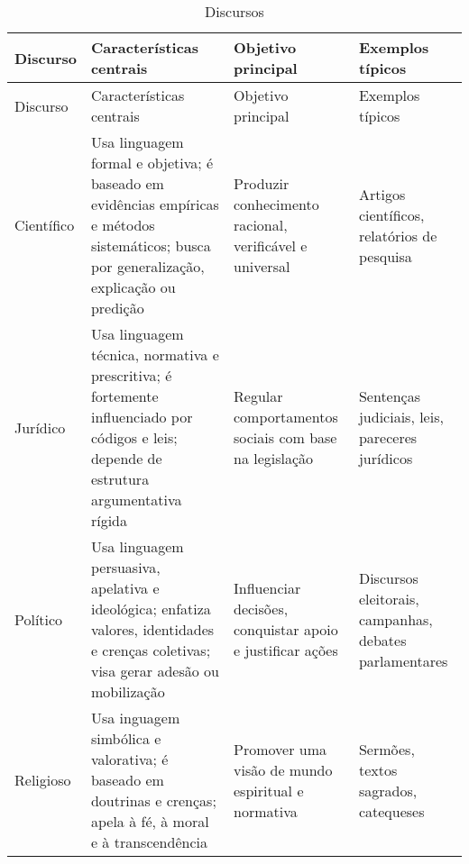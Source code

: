 \documentclass[
  letterpaper,
  DIV=11,
  numbers=noendperiod]{scrreprt}
\begin{document}
\begin{longtable}[]{@{}
  >{\raggedright\arraybackslash}p{}
  >{\raggedright\arraybackslash}p{}
  >{\raggedright\arraybackslash}p{}
  >{\raggedright\arraybackslash}p{}@{}}
\caption{Discursos}\tabularnewline
\toprule\noalign{}
\begin{minipage}[b]{\linewidth}\raggedright
Discurso
\end{minipage} & \begin{minipage}[b]{\linewidth}\raggedright
Características centrais
\end{minipage} & \begin{minipage}[b]{\linewidth}\raggedright
Objetivo principal
\end{minipage} & \begin{minipage}[b]{\linewidth}\raggedright
Exemplos típicos
\end{minipage} \\
\midrule\noalign{}
\endfirsthead
\toprule\noalign{}
\begin{minipage}[b]{\linewidth}\raggedright
Discurso
\end{minipage} & \begin{minipage}[b]{\linewidth}\raggedright
Características centrais
\end{minipage} & \begin{minipage}[b]{\linewidth}\raggedright
Objetivo principal
\end{minipage} & \begin{minipage}[b]{\linewidth}\raggedright
Exemplos típicos
\end{minipage} \\
\midrule\noalign{}
\endhead
\bottomrule\noalign{}
\endlastfoot
Científico & Usa linguagem formal e objetiva; é baseado em evidências
empíricas e métodos sistemáticos; busca por generalização, explicação ou
predição & Produzir conhecimento racional, verificável e universal &
Artigos científicos, relatórios de pesquisa \\
Jurídico & Usa linguagem técnica, normativa e prescritiva; é fortemente
influenciado por códigos e leis; depende de estrutura argumentativa
rígida & Regular comportamentos sociais com base na legislação &
Sentenças judiciais, leis, pareceres jurídicos \\
Político & Usa linguagem persuasiva, apelativa e ideológica; enfatiza
valores, identidades e crenças coletivas; visa gerar adesão ou
mobilização & Influenciar decisões, conquistar apoio e justificar ações
& Discursos eleitorais, campanhas, debates parlamentares \\
Religioso & Usa inguagem simbólica e valorativa; é baseado em doutrinas
e crenças; apela à fé, à moral e à transcendência & Promover uma visão
de mundo espiritual e normativa & Sermões, textos sagrados,
catequeses \\
\end{longtable}
\end{document}
